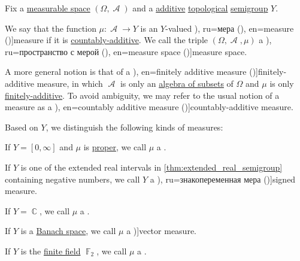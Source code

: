 \begin{definition}\label{def:measure}\mimprovised
  Fix a \hyperref[def:measurable_space]{measurable space} \( (\Omega, \mscrA) \) and a \hyperref[def:additive_semigroup]{additive} \hyperref[def:topological_fol_structures]{topological} \hyperref[def:semigroup]{semigroup} \( Y \).

  We say that the function \( \mu: \mscrA \to Y \) is an \( Y \)-valued \term[bg=мярка (\cite[def. 3.7]{Драганов2022ТеорияНаМярката}), ru=мера (\cite[def. I.1.6]{Ширяев2007ВероятностьТом1}), en=measure (\cite[7]{Cohn2013MeasureTheory})]{measure} if it is \hyperref[def:boolean_algebra_additive_function/countable]{countably-additive}. We call the triple \( (\Omega, \mscrA, \mu) \) a \term[bg=пространство с мярка (\cite[def. 3.9]{Драганов2022ТеорияНаМярката}), ru=пространство с мерой (\cite[def. 1.3.5]{Богачёв2003ОсновыТеорииМерыТом1}), en=measure space (\cite[8]{Cohn2013MeasureTheory})]{measure space}.

  A more general notion is that of a \term[ru=конечно аддитивная мера (\cite[def. I.1.2]{Ширяев2007ВероятностьТом1}), en=finitely additive measure (\cite[7]{Cohn2013MeasureTheory})]{finitely-additive measure}, in which \( \mscrA \) is only an \hyperref[def:algebra_of_subsets]{algebra of subsets} of \( \Omega \) and \( \mu \) is only \hyperref[def:boolean_algebra_additive_function/countable]{finitely-additive}. To avoid ambiguity, we may refer to the usual notion of a measure as a \term[ru=счётно аддитивная мера (\cite[def. I.1.6]{Ширяев2007ВероятностьТом1}), en=countably additive measure (\cite[7]{Cohn2013MeasureTheory})]{countably-additive measure}.

  Based on \( Y \), we distinguish the following kinds of measures:
  \begin{thmenum}
     If \( Y = [0, \infty] \) and \( \mu \) is \hyperref[def:effective_domain]{proper}, we call \( \mu \) a .

    \smallskip

     If \( Y \) is one of the extended real intervals in \cref{thm:extended_real_semigroup} containing negative numbers, we call \( Y \) a \term[bg=знакопроменлива мярка (\cite[def. 10.1]{Драганов2022ТеорияНаМярката}), ru=знакопеременная мера (\cite[def. 20.1]{ДьяченкоУльянов1998МераИИнтеграл})]{signed measure}.

     If \( Y = \BbbC \), we call \( \mu \) a .

     If \( Y \) is a \hyperref[def:banach_space]{Banach space}, we call \( \mu \) a \term[ru=векторная мера (\cite[349]{ИоффеТихомиров1974ЭкстремальныеЗадачи})]{vector measure}.

     If \( Y \) is the \hyperref[def:finite_field]{finite field} \( \BbbF_2 \), we call \( \mu \) a .
  \end{thmenum}
\end{definition}

